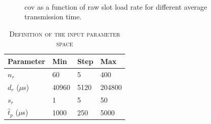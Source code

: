 \begin{figure}[t]
    \centering
     \\
  \caption{\gls{cov} as a function of \gls{raw} slot load rate for different average transmission time.
  \label{fig:tx-diff-load}}
\end{figure}







\begin{table}[t]
\centering
\renewcommand{\arraystretch}{1.2}
\caption{\textsc{Definition of the input parameter space}\label{tab:sumo parameters}}
\begin{tabular}{llll}
\hline
\textbf{Parameter}       & \textbf{Min}  & \textbf{Step}   & \textbf{Max}  \\
\hline
$n_r$        & 60 & 5 & 400  \\
$d_r$ ($\mu$s)          & 40960 & 5120 & 204800    \\
$s_r$           & 1 & 5 & 50    \\
$\hat{t}_p$ ($\mu$s)           & 1000 & 250 & 5000    \\
\hline
\end{tabular}
\end{table}



